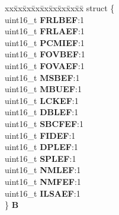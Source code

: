 \begin{DoxyCompactItemize}
\begin{tabbing}
\end{tabbing}\item 
\mbox{\label{unionuCHIERFR_ad7f10c58782a5e4f6d7c4ce8d4d8e620}} 
\begin{tabbing}
xx\=xx\=xx\=xx\=xx\=xx\=xx\=xx\=xx\=\kill
struct \{\\
\>uint16\_t {\bfseries FRLBEF}:1\\
\>uint16\_t {\bfseries FRLAEF}:1\\
\>uint16\_t {\bfseries PCMIEF}:1\\
\>uint16\_t {\bfseries FOVBEF}:1\\
\>uint16\_t {\bfseries FOVAEF}:1\\
\>uint16\_t {\bfseries MSBEF}:1\\
\>uint16\_t {\bfseries MBUEF}:1\\
\>uint16\_t {\bfseries LCKEF}:1\\
\>uint16\_t {\bfseries DBLEF}:1\\
\>uint16\_t {\bfseries SBCFEF}:1\\
\>uint16\_t {\bfseries FIDEF}:1\\
\>uint16\_t {\bfseries DPLEF}:1\\
\>uint16\_t {\bfseries SPLEF}:1\\
\>uint16\_t {\bfseries NMLEF}:1\\
\>uint16\_t {\bfseries NMFEF}:1\\
\>uint16\_t {\bfseries ILSAEF}:1\\
\} {\bfseries B}\\


\end{tabbing}
\end{DoxyCompactItemize}
